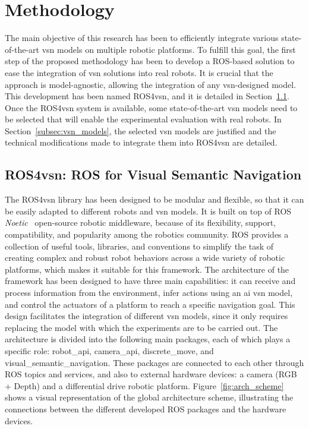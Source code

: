 \section{Methodology}\label{sec:methodology}
The main objective of this research has been to efficiently integrate various state-of-the-art \acrshort{vsn} models on multiple robotic platforms.
To fulfill this goal, the first step of the proposed methodology has been to develop a ROS-based solution to ease the integration of \acrshort{vsn} solutions into real robots.
It is crucial that the approach is model-agnostic, allowing the integration of any \acrshort{vsn}-designed model.
This development has been named ROS4\acrshort{vsn}, and it is detailed in Section~\ref{subsec:ros4vsn}.
Once the ROS4\acrshort{vsn} system is available, some state-of-the-art \acrshort{vsn} models need to be selected that will enable the experimental evaluation with real robots.
In Section~\ref{subsec:vsn_models}, the selected \acrshort{vsn} models are justified and the technical modifications made to integrate them into ROS4\acrshort{vsn} are detailed.


\subsection{ROS4\acrshort{vsn}: ROS for Visual Semantic Navigation}
\label{subsec:ros4vsn}

The ROS4\acrshort{vsn} library has been designed to be modular and flexible, so that it can be easily adapted to different robots and \acrshort{vsn} models.
It is built on top of ROS \textit{Noetic}~\cite{ros} open-source robotic middleware, because of its flexibility, support, compatibility, and popularity among the robotics community.
ROS provides a collection of useful tools, libraries, and conventions to simplify the task of creating complex and robust robot behaviors across a wide variety of robotic platforms, which makes it suitable for this framework.
The architecture of the framework has been designed to have three main capabilities: it can receive and process information from the environment, infer actions using an \acrshort{ai} \acrshort{vsn} model, and control the actuators of a platform to reach a specific navigation goal.
This design facilitates the integration of different \acrshort{vsn} models, since it only requires replacing the model with which the experiments are to be carried out.
The architecture is divided into the following main packages, each of which plays a specific role: robot\_api, camera\_api, discrete\_move, and visual\_semantic\_navigation.
These packages are connected to each other through ROS topics and services, and also to external hardware devices: a camera (RGB + Depth) and a differential drive robotic platform.
Figure~\ref{fig:arch_scheme} shows a visual representation of the global architecture scheme, illustrating the connections between the different developed ROS packages and the hardware devices.

